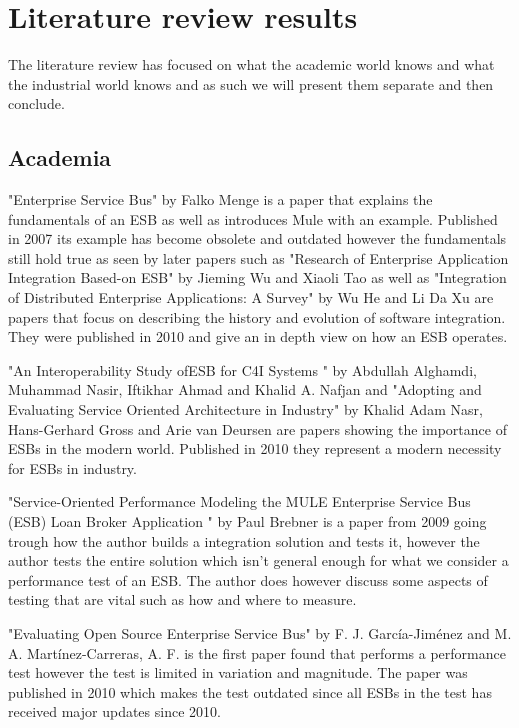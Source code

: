 \documentclass{llncs}
\begin{document}
\label{sec:method}
\section{Literature review results}
\label{sec:litrev}

The literature review has focused on what the academic world knows and what the industrial world knows and as such we will present them separate and then conclude.

\subsection{Academia}
"Enterprise Service Bus"\cite{falko07} by Falko Menge is a paper that explains the fundamentals of an ESB as well as introduces Mule with an example. Published in 2007 its example has become obsolete and outdated however the fundamentals still hold true as seen by later papers such as "Research of Enterprise Application Integration Based-on ESB" \cite{Jieming2010} by Jieming Wu and Xiaoli Tao as well as "Integration of Distributed Enterprise Applications: A Survey" \cite{HeIntegration} by Wu He and Li Da Xu are papers that focus on describing the history and evolution of software integration. They were published in 2010 and give an in depth view on how an ESB  operates.


"An Interoperability  Study  ofESB for C4I  Systems " \cite{Alghamdi2010} by Abdullah Alghamdi, Muhammad Nasir, Iftikhar Ahmad and Khalid A. Nafjan and  "Adopting and Evaluating Service Oriented Architecture in Industry" by Khalid Adam Nasr, Hans-Gerhard Gross and Arie van Deursen are papers showing the importance of ESBs in the modern world. Published in 2010 they represent a modern necessity for ESBs in industry.


"Service-Oriented Performance Modeling the MULE Enterprise Service Bus (ESB) Loan Broker Application " \cite{Brebner2009} by Paul Brebner is a paper from 2009 going trough how the author builds a integration solution and tests it, however the author tests the entire solution which isn't general enough for what we consider a performance test of an ESB. The author does however discuss some aspects of testing that are vital such as how and where to measure.

"Evaluating Open Source Enterprise Service Bus" \cite{Garcia2010} by F. J. García-Jiménez and M. A. Martínez-Carreras, A. F. is the first paper found that performs a performance test however the test is limited in variation and magnitude. The paper was published in 2010 which makes the test outdated since all ESBs in the test has received major updates since 2010.
\end{document}

